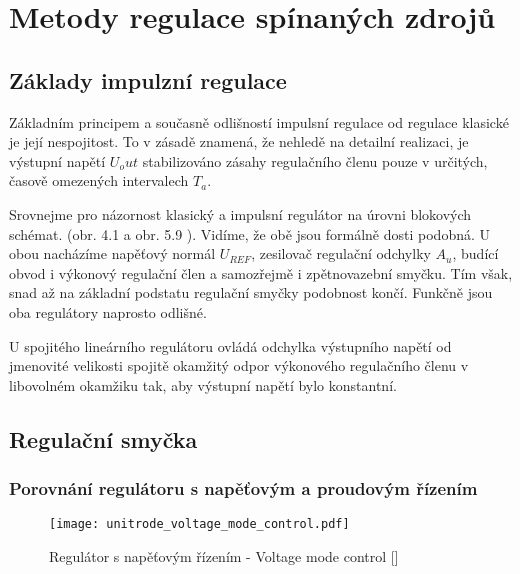 \section{Metody regulace spínaných zdrojů}
      \subsection{Základy impulzní regulace}
        Základním principem a současně odlišností impulsní regulace od regulace klasické je její
        nespojitost. To v zásadě znamená, že nehledě na detailní realizaci, je výstupní napětí
        $U_out$ stabilizováno zásahy regulačního členu pouze v určitých, časově omezených
        intervalech $T_a$. \cite{Hammembauer}

        Srovnejme pro názornost klasický a impulsní regulátor na úrovni blokových schémat. (obr.
        4.1 a obr. 5.9 ). Vidíme, že obě jsou formálně dosti podobná. U obou nacházíme napěťový
        normál $U_{REF}$, zesilovač regulační odchylky $A_u$, budící obvod i výkonový regulační
        člen a samozřejmě i zpětnovazební smyčku. Tím však, snad až na základní podstatu regulační
        smyčky podobnost končí. Funkčně jsou oba regulátory naprosto odlišné.

        U spojitého lineárního regulátoru ovládá odchylka výstupního napětí od jmenovité velikosti
        spojitě okamžitý odpor výkonového regulačního členu v libovolném okamžiku tak, aby výstupní
        napětí bylo konstantní.

      \subsection{Regulační smyčka}

      \subsubsection{Porovnání regulátoru s napěťovým a proudovým řízením}
        \begin{figure*}
          \centering
          \texttt{[image: unitrode\_voltage\_mode\_control.pdf]}
          \caption[Regulátor s napěťovým řízením]{Regulátor s napěťovým řízením - Voltage mode
                   control [\cite{SLUA119}]}
          \label{ENZ:fig_V_mode_cntrl}
        \end{figure*}

